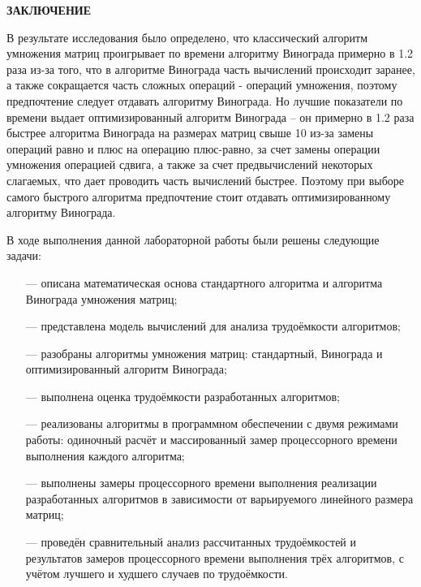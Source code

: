 \begin{center}
    \textbf{ЗАКЛЮЧЕНИЕ}
\end{center}

В результате исследования было определено, что классический алгоритм умножения матриц проигрывает по времени алгоритму Винограда примерно в 1.2 раза из-за того, что в алгоритме Винограда часть вычислений происходит заранее, а также сокращается часть сложных операций - операций умножения, поэтому предпочтение следует отдавать алгоритму Винограда. Но лучшие показатели по времени выдает оптимизированный алгоритм Винограда -- он примерно в 1.2 раза быстрее алгоритма Винограда на размерах матриц свыше 10 из-за замены операций равно и плюс на операцию плюс-равно, за счет замены операции умножения операцией сдвига, а также за счет предвычислений некоторых слагаемых, что дает проводить часть вычислений быстрее. Поэтому при выборе самого быстрого алгоритма предпочтение стоит отдавать оптимизированному алгоритму Винограда.

\vspace{5mm}

В ходе выполнения данной лабораторной работы были решены следующие задачи:
\begin{itemize} \item[---] описана математическая основа стандартного алгоритма и алгоритма Винограда умножения матриц; \item[---] представлена модель вычислений для анализа трудоёмкости алгоритмов; \item[---] разобраны алгоритмы умножения матриц: стандартный, Винограда и оптимизированный алгоритм Винограда; \item[---] выполнена оценка трудоёмкости разработанных алгоритмов; \item[---] реализованы алгоритмы в программном обеспечении с двумя режимами работы: одиночный расчёт и массированный замер процессорного времени выполнения каждого алгоритма; \item[---] выполнены замеры процессорного времени выполнения реализации разработанных алгоритмов в зависимости от варьируемого линейного размера матриц; \item[---] проведён сравнительный анализ рассчитанных трудоёмкостей и результатов замеров процессорного времени выполнения трёх алгоритмов, с учётом лучшего и худшего случаев по трудоёмкости. \end{itemize}
